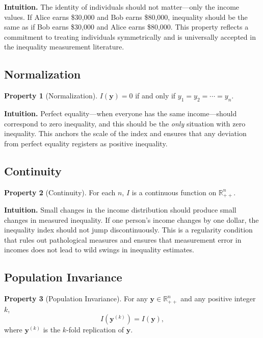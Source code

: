 \documentclass[12pt]{article}
\theoremstyle{plain}
\theoremstyle{definition}
\newtheorem{axiom}{Property}
\theoremstyle{remark}
\newcommand{\R}{\mathbb{R}}
\newcommand{\bfy}{\mathbf{y}}
\begin{document}
\textbf{Intuition.}
The identity of individuals should not matter---only the income values.
If Alice earns \$30{,}000 and Bob earns \$80{,}000, inequality should be the same as if Bob earns \$30{,}000 and Alice earns \$80{,}000.
This property reflects a commitment to treating individuals symmetrically and is universally accepted in the inequality measurement literature.

\subsection{Normalization}\label{sec:normalization}

\begin{axiom}[Normalization]\label{ax:norm}
$I(\bfy) = 0$ if and only if $y_1 = y_2 = \cdots = y_n$.
\end{axiom}

\textbf{Intuition.}
Perfect equality---when everyone has the same income---should correspond to zero inequality, and this should be the \emph{only} situation with zero inequality.
This anchors the scale of the index and ensures that any deviation from perfect equality registers as positive inequality.

\subsection{Continuity}\label{sec:continuity}

\begin{axiom}[Continuity]\label{ax:cont}
For each $n$, $I$ is a continuous function on $\R_{++}^n$.
\end{axiom}

\textbf{Intuition.}
Small changes in the income distribution should produce small changes in measured inequality.
If one person's income changes by one dollar, the inequality index should not jump discontinuously.
This is a regularity condition that rules out pathological measures and ensures that measurement error in incomes does not lead to wild swings in inequality estimates.

\subsection{Population Invariance}\label{sec:popinv}

\begin{axiom}[Population Invariance]\label{ax:pop}
For any $\bfy \in \R_{++}^n$ and any positive integer $k$,
\begin{equation}
I(\bfy^{(k)}) = I(\bfy),
\end{equation}
where $\bfy^{(k)}$ is the $k$-fold replication of $\bfy$.
\end{axiom}
\end{document}
